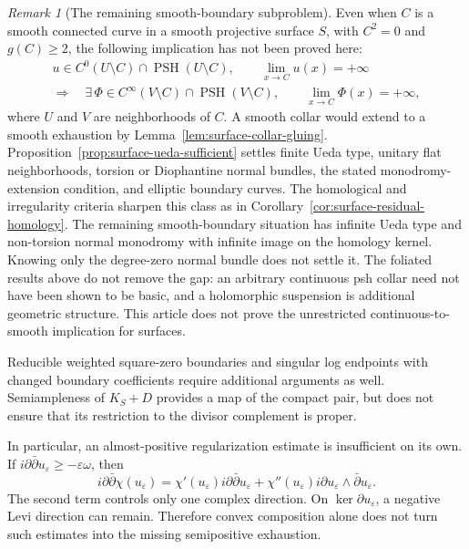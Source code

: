 \documentclass[11pt]{amsart}
\theoremstyle{definition}
\theoremstyle{remark}
\newtheorem{remark}[theorem]{Remark}
\numberwithin{equation}{section}
\begin{document}
\begin{remark}[The remaining smooth-boundary subproblem]
\label{rem:surface-unproved-collar}
Even when $C$ is a smooth connected curve in a smooth projective
surface $S$, with $C^2=0$ and $g(C)\ge2$, the following implication
has not been proved here:
\[
 \begin{gathered}
 u\in C^0(U\setminus C)\cap\operatorname{PSH}(U\setminus C),
 \qquad \lim_{x\to C}u(x)=+\infty
 \\[2pt]
 \Longrightarrow\quad
 \exists\,\Phi\in C^\infty(V\setminus C)\cap\operatorname{PSH}(V\setminus C),
 \qquad \lim_{x\to C}\Phi(x)=+\infty,
 \end{gathered}
\]
where $U$ and $V$ are neighborhoods of $C$.  A smooth collar would
extend to a smooth exhaustion by Lemma~\ref{lem:surface-collar-gluing}.
Proposition~\ref{prop:surface-ueda-sufficient} settles finite Ueda
type, unitary flat neighborhoods, torsion or Diophantine normal bundles,
the stated monodromy-extension condition, and elliptic boundary curves.
The homological and irregularity criteria sharpen this class as
in Corollary~\ref{cor:surface-residual-homology}. The remaining
smooth-boundary situation has infinite Ueda type and non-torsion
normal monodromy with infinite image on the homology kernel. Knowing
only the degree-zero normal bundle does not settle it. The foliated results above do not
remove the gap: an arbitrary
continuous psh collar need not have been shown to be basic, and a
holomorphic suspension is additional geometric structure. This article
does not prove the unrestricted continuous-to-smooth implication for surfaces.

Reducible weighted square-zero boundaries and singular log endpoints
with changed boundary coefficients require additional arguments as
well. Semiampleness of $K_S+D$ provides a map of the compact pair, but
does not ensure that its restriction to the divisor complement is proper.

In particular, an almost-positive regularization estimate is
insufficient on its own.  If
$i\partial\bar\partial u_\varepsilon\ge-\varepsilon\omega$, then
\[
 i\partial\bar\partial\chi(u_\varepsilon)
 =\chi'(u_\varepsilon)i\partial\bar\partial u_\varepsilon
 +\chi''(u_\varepsilon)i\partial u_\varepsilon
       \wedge\bar\partial u_\varepsilon.
\]
The second term controls only one complex direction.  On
$\ker\partial u_\varepsilon$, a negative Levi direction can remain.
Therefore convex composition alone does not turn such estimates into
the missing semipositive exhaustion.
\end{remark}
\end{document}
